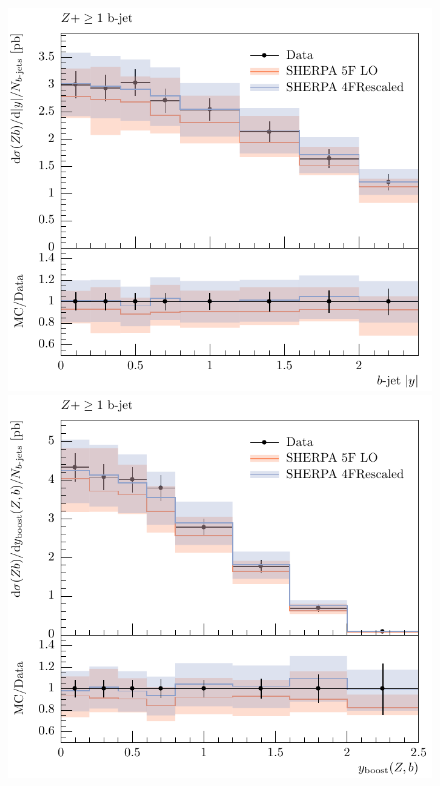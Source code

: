 \documentclass[11pt]{cernrep}
\begin{document}
\begin{figure}[htbp]
\begin{center}
   \includegraphics[scale=0.65]{figs/zbb/sherpa/d05-x01-y01_rescaled.pdf} 
   \includegraphics[scale=0.65]{figs/zbb/sherpa/d07-x01-y01_rescaled.pdf} \\

\end{center}
\end{figure}
\end{document}
